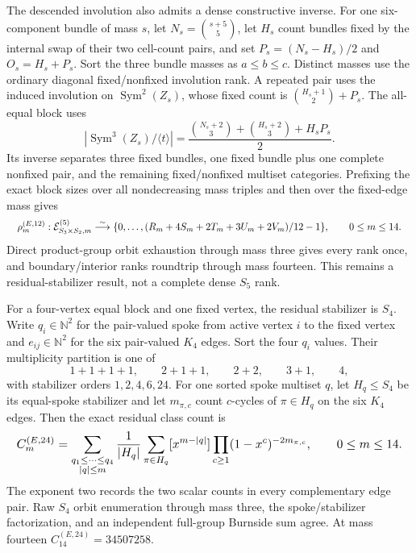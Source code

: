 \documentclass{article}
\newcommand{\fitmath}[1]{\resizebox{0.99\linewidth}{!}{$\displaystyle #1$}}
\begin{document}
The descended involution also admits a dense constructive inverse. For one
six-component bundle of mass $s$, let $N_s=\binom{s+5}{5}$, let $H_s$ count
bundles fixed by the internal swap of their two cell-count pairs, and set
$P_s=(N_s-H_s)/2$ and $O_s=H_s+P_s$. Sort the three bundle masses as
$a\leq b\leq c$. Distinct masses use the ordinary diagonal fixed/nonfixed
involution rank. A repeated pair uses the induced involution on
$\operatorname{Sym}^2(Z_s)$, whose fixed count is
$\binom{H_s+1}{2}+P_s$. The all-equal block uses
\[
  \left|\operatorname{Sym}^3(Z_s)/\langle t\rangle\right|
   =\frac{\binom{N_s+2}{3}+\binom{H_s+2}{3}+H_s P_s}{2}.
\]
Its inverse separates three fixed bundles, one fixed bundle plus one complete
nonfixed pair, and the remaining fixed/nonfixed multiset categories. Prefixing
the exact block sizes over all nondecreasing mass triples and then over the
fixed-edge mass gives
\begin{equation}
  \fitmath{%
    \rho^{(E,12)}_m:
      \mathcal E^{(5)}_{S_3\times S_2,m}
      \overset{\sim}{\longrightarrow}
      \{0,\ldots,(R_m+4S_m+2T_m+3U_m+2V_m)/12-1\},
    \qquad 0\leq m\leq14.
  }
  \label{eq:optimization-crazy-preimage-cube-quintuple-s3s2-edge-ranking}
\end{equation}
Direct product-group orbit exhaustion through mass three gives every rank once,
and boundary/interior ranks roundtrip through mass fourteen. This remains a
residual-stabilizer result, not a complete dense $S_5$ rank.

For a four-vertex equal block and one fixed vertex, the residual stabilizer is
$S_4$. Write $q_i\in\mathbb N^2$ for the pair-valued spoke from active vertex
$i$ to the fixed vertex and $e_{ij}\in\mathbb N^2$ for the six pair-valued
$K_4$ edges. Sort the four $q_i$ values. Their multiplicity partition is one of
\[
  1+1+1+1,\qquad 2+1+1,\qquad 2+2,\qquad 3+1,\qquad 4,
\]
with stabilizer orders $1,2,4,6,24$. For one sorted spoke multiset $q$, let
$H_q\leq S_4$ be its equal-spoke stabilizer and let $m_{\pi,c}$ count
$c$-cycles of $\pi\in H_q$ on the six $K_4$ edges. Then the exact residual
class count is
\begin{equation}
  \fitmath{%
    C^{(E,24)}_m=
      \sum_{\substack{q_1\leq\cdots\leq q_4\\|q|\leq m}}
      \frac{1}{|H_q|}
      \sum_{\pi\in H_q}
      [x^{m-|q|}]
      \prod_{c\geq1}(1-x^c)^{-2m_{\pi,c}},
    \qquad 0\leq m\leq14.
  }
  \label{eq:optimization-crazy-preimage-cube-quintuple-s4-edge-decomposition}
\end{equation}
The exponent two records the two scalar counts in every complementary edge
pair. Raw $S_4$ orbit enumeration through mass three, the spoke/stabilizer
factorization, and an independent full-group Burnside sum agree. At mass
fourteen $C^{(E,24)}_{14}=34507258$.
\end{document}

